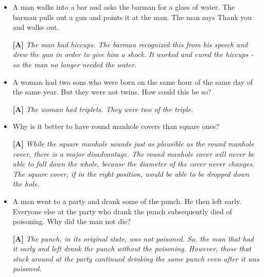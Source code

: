 \begin{enumerate}
\begin{itemize}
\item
  A man walks into a bar and asks the barman for a glass of water. The
  barman pulls out a gun and points it at the man. The man says
  \textquotesingle Thank you\textquotesingle{} and walks out.

  \begin{onlysolution}
    \textbf{[A]}
    \itshape
    The man had hiccups. The barman recognized this from his speech and drew
    the gun in order to give him a shock. It worked and cured the hiccups - 
    so the man no longer needed the water.
  \end{onlysolution}

\item
  A woman had two sons who were born on the same hour of the same day of
  the same year. But they were not twins. How could this be so?

  \begin{onlysolution}
    \textbf{[A]}
    \itshape
    The woman had triplets. They were two of the triple.
  \end{onlysolution}

\item
  Why is it better to have round manhole covers than square ones?

  \begin{onlysolution}
    \textbf{[A]}
    \itshape
    While the square manhole sounds just as plausible as the round manhole cover, 
    there is a major disadvantage. The round manhole cover will never be able to 
    fall down the whole, because the diameter of the cover never changes. The square 
    cover, if in the right position, would be able to be dropped down the hole.
  \end{onlysolution}

\item
  A man went to a party and drank some of the punch. He then left early.
  Everyone else at the party who drank the punch subsequently died of
  poisoning. Why did the man not die?

  \begin{onlysolution}
    \textbf{[A]}
    \itshape
    The punch, in its original state, was not poisoned. So, the man that had 
    it early and left drank the punch without the poisoning. However, those 
    that stuck around at the party continued drinking the same punch even 
    after it was poisoned.
  \end{onlysolution}


\end{itemize}
\end{enumerate}
